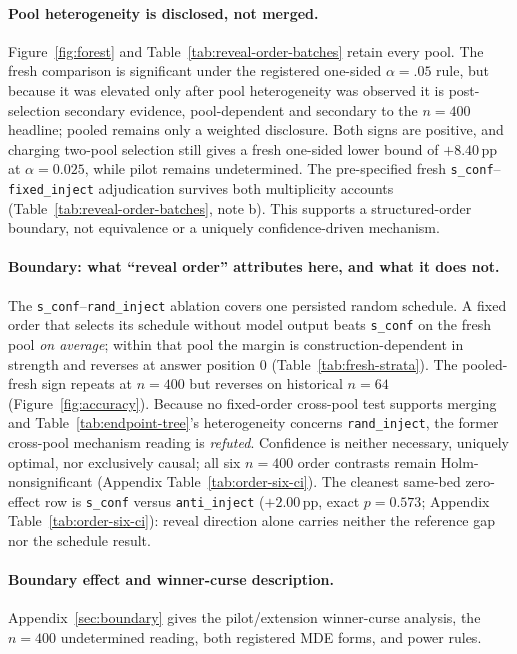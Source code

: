 \documentclass{article}
\newcommand{\sconf}{\texttt{s\_conf}}
\newcommand{\rinj}{\texttt{rand\_inject}}
\newcommand{\ainj}{\texttt{anti\_inject}}
\newcommand{\finj}{\texttt{fixed\_inject}}
\newcommand{\pp}{\,\mathrm{pp}}
\begin{document}
\paragraph{Pool heterogeneity is disclosed, not merged.}
Figure~\ref{fig:forest} and Table~\ref{tab:reveal-order-batches} retain every
pool.  The fresh comparison is significant under the registered one-sided
$\alpha=.05$ rule, but because it was elevated only after pool heterogeneity was
observed it is post-selection secondary evidence, pool-dependent and secondary
to the $n=400$ headline; pooled remains only a weighted disclosure.  Both signs
are positive, and charging two-pool selection still gives a fresh one-sided
lower bound of $+8.40\pp$ at $\alpha=0.025$, while pilot remains undetermined.
The pre-specified fresh \sconf{}--\finj{} adjudication survives both
multiplicity accounts (Table~\ref{tab:reveal-order-batches}, note b).  This
supports a structured-order boundary, not equivalence or a uniquely
confidence-driven mechanism.

\paragraph{Boundary: what ``reveal order'' attributes here, and what it does not.}
The \sconf{}--\rinj{} ablation covers one persisted random schedule.  A
fixed order that selects its schedule without model output beats \sconf{} on
the fresh pool \emph{on average}; within that pool the margin is
construction-dependent in strength and reverses at answer position 0
(Table~\ref{tab:fresh-strata}).  The pooled-fresh sign repeats at $n{=}400$ but
reverses on historical $n{=}64$ (Figure~\ref{fig:accuracy}).  Because no fixed-order cross-pool test supports
merging and Table~\ref{tab:endpoint-tree}'s heterogeneity concerns \rinj{}, the
former cross-pool mechanism reading is \emph{refuted}.  Confidence is neither
necessary, uniquely optimal, nor exclusively causal; all six $n{=}400$ order
contrasts remain Holm-nonsignificant (Appendix Table~\ref{tab:order-six-ci}).
The cleanest same-bed zero-effect row is \sconf{} versus \ainj{}
($+2.00\pp$, exact $p{=}0.573$; Appendix Table~\ref{tab:order-six-ci}): reveal
direction alone carries neither the reference gap nor the schedule result.

\paragraph{Boundary effect and winner-curse description.}
Appendix~\ref{sec:boundary} gives the pilot/extension winner-curse analysis,
the $n{=}400$ undetermined reading, both registered MDE forms, and power rules.
\end{document}
